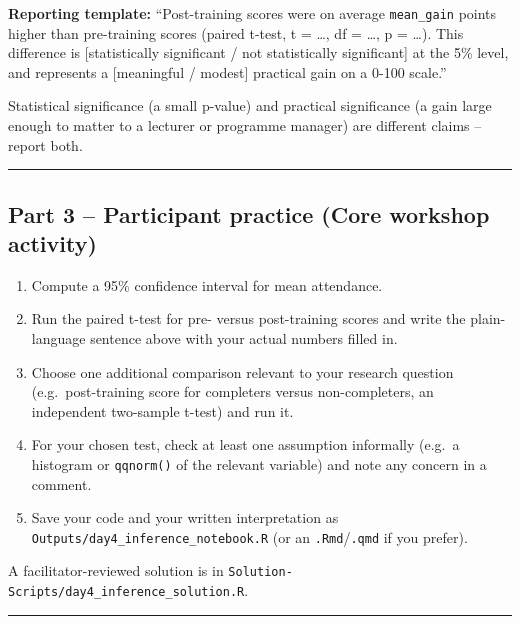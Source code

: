 \documentclass[11pt]{article}
\providecommand{\tightlist}{%
  \setlength{\itemsep}{0pt}\setlength{\parskip}{0pt}}
\begin{document}
\textbf{Reporting template:} ``Post-training scores were on average
\texttt{mean\_gain} points higher than pre-training scores (paired
t-test, t = \ldots, df = \ldots, p = \ldots). This difference is
{[}statistically significant / not statistically significant{]} at the
5\% level, and represents a {[}meaningful / modest{]} practical gain on
a 0-100 scale.''

Statistical significance (a small p-value) and practical significance (a
gain large enough to matter to a lecturer or programme manager) are
different claims -- report both.

\begin{center}\rule{0.5\linewidth}{0.5pt}\end{center}

\hypertarget{part-3-participant-practice-core-workshop-activity}{%
\subsection{Part 3 -- Participant practice (Core workshop
activity)}\label{part-3-participant-practice-core-workshop-activity}}

\begin{enumerate}
\def\labelenumi{\arabic{enumi}.}
\tightlist
\item
  Compute a 95\% confidence interval for mean attendance.
\item
  Run the paired t-test for pre- versus post-training scores and write
  the plain-language sentence above with your actual numbers filled in.
\item
  Choose one additional comparison relevant to your research question
  (e.g.~post-training score for completers versus non-completers, an
  independent two-sample t-test) and run it.
\item
  For your chosen test, check at least one assumption informally (e.g.~a
  histogram or \texttt{qqnorm()} of the relevant variable) and note any
  concern in a comment.
\item
  Save your code and your written interpretation as
  \texttt{Outputs/day4\_inference\_notebook.R} (or an
  \texttt{.Rmd}/\texttt{.qmd} if you prefer).
\end{enumerate}

A facilitator-reviewed solution is in
\texttt{Solution-Scripts/day4\_inference\_solution.R}.

\begin{center}\rule{0.5\linewidth}{0.5pt}\end{center}
\end{document}
